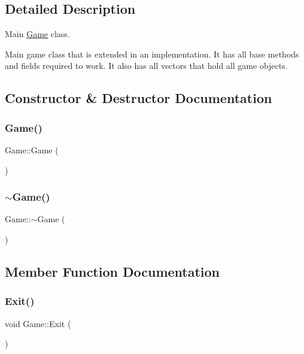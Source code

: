 \subsection{Detailed Description}
Main \mbox{\hyperlink{class_game}{Game}} class. 

Main game class that is extended in an implementation. It has all base methods and fields required to work. It also has all vectors that hold all game objects. 

\subsection{Constructor \& Destructor Documentation}
\mbox{\label{class_game_ad59df6562a58a614fda24622d3715b65}} 
\subsubsection{\texorpdfstring{Game()}{Game()}}
{\footnotesize\ttfamily Game\+::\+Game (\begin{DoxyParamCaption}{ }\end{DoxyParamCaption})}

\mbox{\label{class_game_ae3d112ca6e0e55150d2fdbc704474530}} 
\subsubsection{\texorpdfstring{$\sim$Game()}{~Game()}}
{\footnotesize\ttfamily Game\+::$\sim$\+Game (\begin{DoxyParamCaption}{ }\end{DoxyParamCaption})}



\subsection{Member Function Documentation}
\mbox{\label{class_game_ad06e374518f2c8fa38279be6712a6ea4}} 
\subsubsection{\texorpdfstring{Exit()}{Exit()}}
{\footnotesize\ttfamily void Game\+::\+Exit (\begin{DoxyParamCaption}{ }\end{DoxyParamCaption})}

